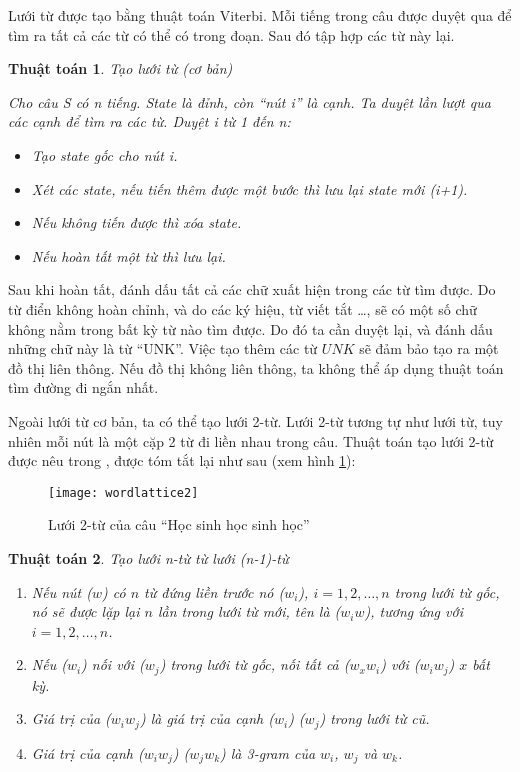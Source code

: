 \documentclass[a4paper,oneside]{book} %
\newtheorem{algo}{Thuật toán}
\begin{document}
Lưới từ được tạo bằng thuật toán Viterbi. Mỗi tiếng trong câu được
duyệt qua để tìm ra tất cả các từ có thể có trong đoạn. Sau đó tập hợp
các từ này lại. 

\begin{algo} Tạo lưới từ (cơ bản)

Cho câu S có n tiếng. State là đỉnh, còn ``nút i'' là cạnh. Ta duyệt
lần lượt qua các cạnh để tìm  ra các từ. Duyệt i từ 1 đến n:
\begin{itemize}
\item Tạo state gốc cho nút i.
\item Xét các state, nếu tiến thêm được một bước thì lưu lại state mới (i+1).
\item Nếu không tiến được thì xóa state.
\item Nếu hoàn tất một từ thì lưu lại.
\end{itemize}
\end{algo}

Sau khi hoàn tất, đánh dấu tất cả các chữ xuất hiện trong các từ tìm
được. Do từ điển không hoàn chỉnh, và do các ký hiệu, từ viết tắt
\ldots{}, sẽ có một số chữ không nằm trong bất kỳ từ nào tìm được. Do
đó ta cần duyệt lại, và đánh dấu những chữ này là từ ``UNK''. Việc tạo
thêm các từ $UNK$ sẽ đảm bảo tạo ra một đồ thị liên thông. Nếu đồ
thị không liên thông, ta không thể áp dụng thuật toán tìm đường đi
ngắn nhất.

Ngoài lưới từ cơ bản, ta có thể tạo lưới 2-từ. Lưới 2-từ
tương tự như lưới từ, tuy nhiên mỗi nút là một cặp 2 từ đi liền nhau
trong câu. Thuật toán tạo lưới 2-từ được nêu trong \cite{Ravishankar},
được tóm tắt lại như sau (xem hình \ref{fig:wordlattice2}):

\begin{figure}[htbp]
  \centering
  \texttt{[image: wordlattice2]}
  \caption{Lưới 2-từ của câu ``Học sinh học sinh học''}
  \label{fig:wordlattice2}
\end{figure}

\begin{algo}Tạo lưới n-từ từ lưới (n-1)-từ

\begin{enumerate}
\item Nếu nút ($w$) có $n$ từ đứng liền trước nó ($w_i$),
  $i=1,2,\ldots,n$ trong lưới từ gốc, nó sẽ được lặp lại $n$ lần trong
  lưới từ mới, tên là ($w_{i}w$), tương ứng với $i=1,2,\ldots,n$.
\item Nếu ($w_i$) nối với ($w_j$) trong lưới từ gốc, nối tất cả
  ($w_xw_i$) với ($w_iw_j$) $x$ bất kỳ.
\item Giá trị của ($w_iw_j$) là giá trị của cạnh ($w_i$) ($w_j$) trong
  lưới từ cũ.
\item Giá trị của cạnh ($w_iw_j$) ($w_jw_k$) là 3-gram của $w_i$, $w_j$
  và $w_k$.
\end{enumerate}
\end{algo}
\end{document}
